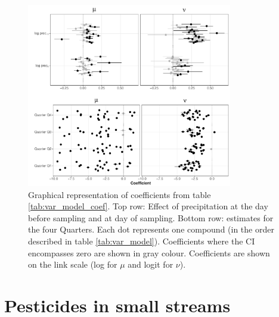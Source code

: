 \documentclass[pdftex,
	a4paper,
	titlepage=false]{scrreprt}
\begin{document}
\begin{figure}[ht]
	\centering
	\includegraphics[width = 0.8\textwidth]{coefs}
	\caption[Graphical representation of coefficients from table \ref{tab:var_model_coef}.]{Graphical representation of coefficients from table \ref{tab:var_model_coef}. Top row: Effect of precipitation at the day before sampling and at day of sampling. Bottom row: estimates for the four Quarters. Each dot represents one compound (in the order described in table \ref{tab:var_model}). Coefficients where the CI encompasses zero are shown in gray colour. Coefficients are shown on the link scale (log for $\mu$ and logit for $\nu$).}
	\label{fig:coefs}
\end{figure}



\chapter{Pesticides in small streams}

\end{document}
